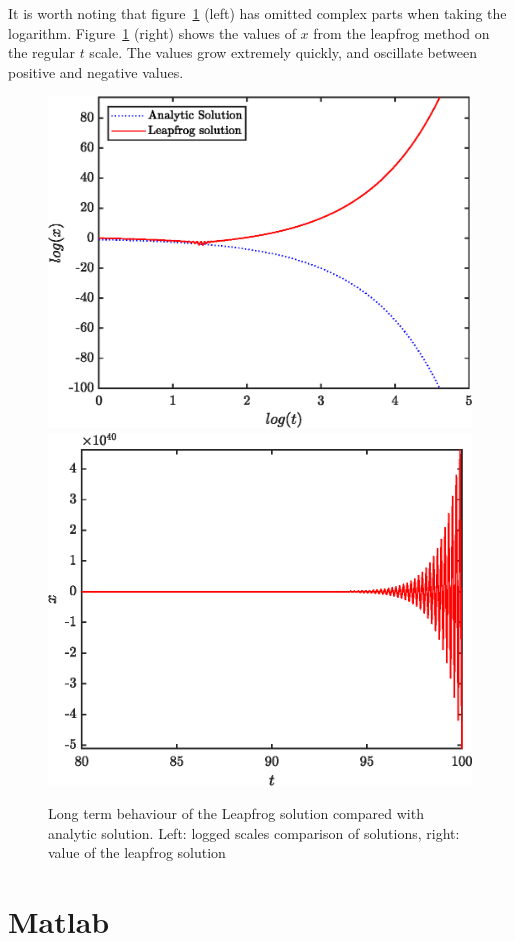 \documentclass{X:/Documents/Coding/Latex/myassignment}
\begin{document}
\begin{enumerate}
\begin{enumerate}
		It is worth noting that figure~\ref{fig:3c} (left) has omitted complex parts when taking the logarithm. Figure~\ref{fig:3c} (right) shows the values of $x$ from the leapfrog method on the regular $t$ scale. The values grow extremely quickly, and oscillate between positive and negative values.
			\begin{figure}[tbh]
				\centering
				\includegraphics[width=0.45\linewidth]{ODEsA4Q3c.eps}
				\includegraphics[width=0.45\linewidth]{ODEsA4Q3c2.eps}
				\caption{Long term behaviour of the Leapfrog solution compared with analytic solution. Left: logged scales comparison of solutions, right: value of the leapfrog solution}
				\label{fig:3c}
			\end{figure}

	\end{enumerate}
\end{enumerate}

\clearpage
\section*{Matlab}




\end{document}
